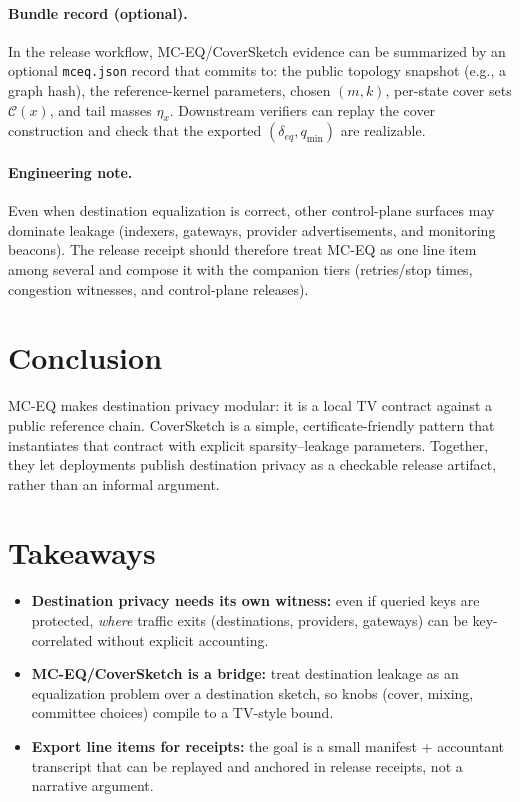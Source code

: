\documentclass[11pt]{article}
\begin{document}
\paragraph{Bundle record (optional).}
In the release workflow, MC-EQ/CoverSketch evidence can be summarized by an optional \texttt{mceq.json} record that commits to:
the public topology snapshot (e.g., a graph hash), the reference-kernel parameters, chosen $(m,k)$, per-state cover sets $\mathcal{C}(x)$, and tail masses $\eta_x$.
Downstream verifiers can replay the cover construction and check that the exported $(\delta_{eq},q_{\min})$ are realizable.

\paragraph{Engineering note.}
Even when destination equalization is correct, other control-plane surfaces may dominate leakage (indexers, gateways, provider advertisements, and monitoring beacons).
The release receipt should therefore treat MC-EQ as one line item among several and compose it with the companion tiers (retries/stop times, congestion witnesses, and control-plane releases).\cite{series:traceifaces,series:wcongeq,series:state3}

\section{Conclusion}
MC-EQ makes destination privacy modular: it is a local TV contract against a public reference chain.
CoverSketch is a simple, certificate-friendly pattern that instantiates that contract with explicit sparsity--leakage parameters.
Together, they let deployments publish destination privacy as a checkable release artifact, rather than an informal argument.

\section{Takeaways}
\begin{itemize}[leftmargin=*]
\item \textbf{Destination privacy needs its own witness:} even if queried keys are protected, \emph{where} traffic exits (destinations, providers, gateways) can be key-correlated without explicit accounting.
\item \textbf{MC-EQ/CoverSketch is a bridge:} treat destination leakage as an equalization problem over a destination sketch, so knobs (cover, mixing, committee choices) compile to a TV-style bound.
\item \textbf{Export line items for receipts:} the goal is a small manifest + accountant transcript that can be replayed and anchored in release receipts, not a narrative argument.
\end{itemize}
\end{document}
